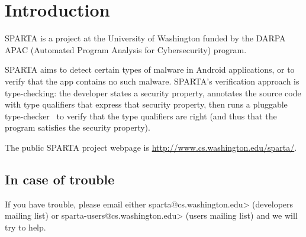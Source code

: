 \htmlhr
\chapter{Introduction\label{introduction}}

SPARTA is a project at the University of Washington funded by the DARPA
APAC (Automated Program Analysis for Cybersecurity) program.


SPARTA aims to detect certain types of malware in Android applications, or
to verify that the app contains no such malware.  SPARTA's verification
approach is type-checking:  the developer states a security property,
annotates the source code with type qualifiers that express that security
property, then runs a pluggable type-checker~\cite{PapiACPE2008,DietlDEMS2011} to verify that the type
qualifiers are right (and thus that the program satisfies the security
property).

The public SPARTA project webpage is
\url{http://www.cs.washington.edu/sparta/}.


\section{In case of trouble}

If you have trouble, please email either \<sparta@cs.washington.edu>
(developers mailing list) or \<sparta-users@cs.washington.edu> (users
mailing list) and we will try to help.





